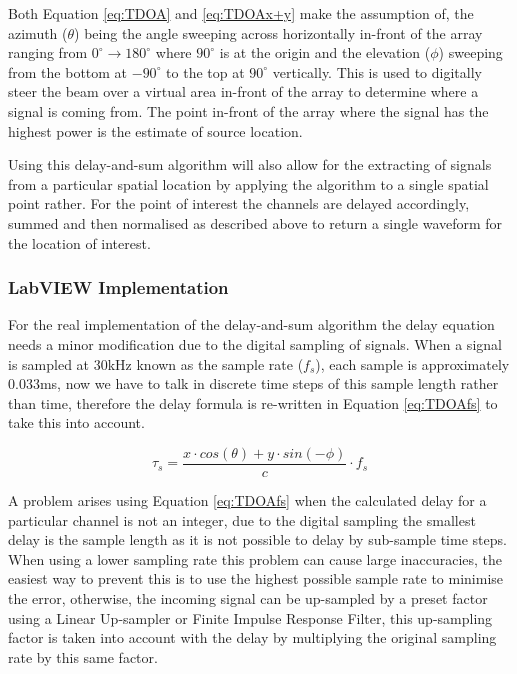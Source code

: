 \documentclass{UoNMCHA}
\numberwithin{equation}{section}
\begin{document}
    Both Equation \ref{eq:TDOA} and \ref{eq:TDOAx+y} make the assumption of, the azimuth ($\theta$) being the angle sweeping across horizontally in-front of the array ranging from $0^{\circ} \to 180^{\circ}$ where $90^{\circ}$ is at the origin and the elevation ($\phi$) sweeping from the bottom at $-90^{\circ}$ to the top at $90^{\circ}$ vertically. This is used to digitally steer the beam over a virtual area in-front of the array to determine where a signal is coming from. The point in-front of the array where the signal has the highest power is the estimate of source location.
    
    Using this delay-and-sum algorithm will also allow for the extracting of signals from a particular spatial location by applying the algorithm to a single spatial point rather. For the point of interest the channels are delayed accordingly, summed and then normalised as described above to return a single waveform for the location of interest.
\subsubsection{LabVIEW Implementation} \label{sec:DAS Implementation}
    For the real implementation of the delay-and-sum algorithm the delay equation needs a minor modification due to the digital sampling of signals. When a signal is sampled at $30$kHz known as the sample rate ($f_s$), each sample is approximately $0.033$ms, now we have to talk in discrete time steps of this sample length rather than time, therefore the delay formula is re-written in Equation \ref{eq:TDOAfs} to take this into account.
    
    \begin{equation}
        \tau_s = \frac{x \cdot cos(\theta) + y \cdot sin(-\phi)}{c}\cdot f_s
        \label{eq:TDOAfs}
    \end{equation}
    
    A problem arises using Equation \ref{eq:TDOAfs} when the calculated delay for a particular channel is not an integer, due to the digital sampling the smallest delay is the sample length as it is not possible to delay by sub-sample time steps. When using a lower sampling rate this problem can cause large inaccuracies, the easiest way to prevent this is to use the highest possible sample rate to minimise the error, otherwise, the incoming signal can be up-sampled by a preset factor using a Linear Up-sampler or Finite Impulse Response Filter, this up-sampling factor is taken into account with the delay by multiplying the original sampling rate by this same factor. 
    
\end{document}

